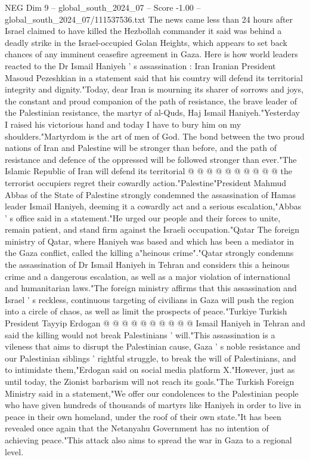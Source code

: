 \begin{textsample}{NEG Dim 9 – global\_south\_2024\_07 – Score -1.00 – global\_south\_2024\_07/111537536.txt}  \label{ex:f9_neg_355}
The news came less than 24 hours after Israel claimed to have killed the Hezbollah commander it said was behind a deadly strike in the Israel-occupied Golan Heights, which appears to set back chances of any imminent ceasefire agreement in Gaza.
Here is how world leaders reacted to the Dr Ismail Haniyeh ' s assassination : Iran Iranian President Masoud Pezeshkian in a statement said that his country will defend its territorial integrity and dignity."Today, dear Iran is mourning its sharer of sorrows and joys, the constant and proud companion of the path of resistance, the brave leader of the Palestinian resistance, the martyr of al-Quds, Haj Ismail Haniyeh."Yesterday I raised his victorious hand and today I have to bury him on my shoulders."Martyrdom is the art of men of God.
The bond between the two proud nations of Iran and Palestine will be stronger than before, and the path of resistance and defence of the oppressed will be followed stronger than ever."The Islamic Republic of Iran will defend its territorial @ @ @ @ @ @ @ @ @ @ the terrorist occupiers regret their cowardly action."Palestine"President Mahmud Abbas of the State of Palestine strongly condemned the assassination of Hamas leader Ismail Haniyeh, deeming it a cowardly act and a serious escalation,"Abbas ' s office said in a statement."He urged our people and their forces to unite, remain patient, and stand firm against the Israeli occupation."Qatar The foreign ministry of Qatar, where Haniyeh was based and which has been a mediator in the Gaza conflict, called the killing a"heinous crime"."Qatar strongly condemns the assassination of Dr Ismail Haniyeh in Tehran and considers this a heinous crime and a dangerous escalation, as well as a major violation of international and humanitarian laws."The foreign ministry affirms that this assassination and Israel ' s reckless, continuous targeting of civilians in Gaza will push the region into a circle of chaos, as well as limit the prospects of peace."Turkiye Turkish President Tayyip Erdogan @ @ @ @ @ @ @ @ @ @ Ismail Haniyeh in Tehran and said the killing would not break Palestinians ' will."This assassination is a vileness that aims to disrupt the Palestinian cause, Gaza ' s noble resistance and our Palestinian siblings ' rightful struggle, to break the will of Palestinians, and to intimidate them,"Erdogan said on social media platform X."However, just as until today, the Zionist barbarism will not reach its goals."The Turkish Foreign Ministry said in a statement,"We offer our condolences to the Palestinian people who have given hundreds of thousands of martyrs like Haniyeh in order to live in peace in their own homeland, under the roof of their own state."It has been revealed once again that the Netanyahu Government has no intention of achieving peace."This attack also aims to spread the war in Gaza to a regional level.

\end{textsample}
